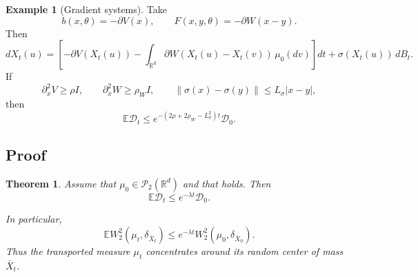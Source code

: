 \documentclass{tsp-short}
\newtheorem{theorem}{Theorem}[section]
\theoremstyle{remark}
\theoremstyle{definition}
\newtheorem{example}{Example}[section]
\newcommand{\R}{\mathbb{R}} %
\newcommand{\cP}{\mathcal{P}} %
\newcommand{\E}{\mathbb E} %
\begin{document}
\begin{example}[Gradient systems]
	Take
	\begin{equation*}
		b(x,\theta)=-\partial V(x), \qquad F(x,y,\theta)=-\partial W(x-y).
	\end{equation*}
	Then
	\begin{equation*}
		dX_t(u) =  \left[ -\partial V(X_t(u)) - \int_{\R^d} \partial W(X_t(u)-X_t(v))\,\mu_0(dv) \right]dt + \sigma(X_t(u))\,dB_t.
	\end{equation*}
	If
	\begin{equation*}
		\partial_x^2 V\ge \rho I, \qquad \partial_x^2 W\ge \rho_W I, \qquad \|\sigma(x)-\sigma(y)\| \le L_\sigma |x-y|,
	\end{equation*}
	then
	\begin{equation*}
		\E\mathcal D_t \le e^{-(2\rho+2\rho_W-L_\sigma^2)t}\mathcal D_0.
	\end{equation*}
\end{example}

\subsection{Proof}\label{subsec:synchronization-proof}
\begin{theorem}\label{thm:synchronization-dissipativity}
	Assume that \(\mu_0\in\cP_2(\R^d)\) and that  holds. Then
	\begin{equation*}
		\E\mathcal D_t \le e^{-\lambda t}\mathcal D_0.
	\end{equation*}

	In particular,
	\begin{equation*}
		\E W_2^2(\mu_t,\delta_{\bar X_t}) \le e^{-\lambda t}W_2^2(\mu_0,\delta_{\bar X_0}).
	\end{equation*}
	Thus the transported measure \(\mu_t\) concentrates around its random center of mass \(\bar X_t\).
\end{theorem}
\end{document}
